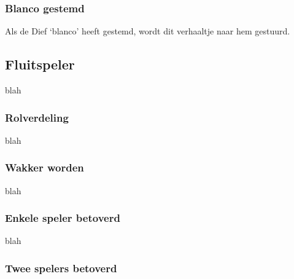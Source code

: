 \documentclass[12pt]{article}
\begin{document}
    \subsubsection{Blanco gestemd}
    
      Als de Dief `blanco' heeft gestemd, wordt dit verhaaltje naar hem gestuurd.
    
      \begin{center}
      \end{center}
  
  \subsection{Fluitspeler}
    
      blah
  
    \subsubsection{Rolverdeling}
    
      blah
    
    \subsubsection{Wakker worden}
    
      blah
    
    \subsubsection{Enkele speler betoverd}
    
      blah
    
    \subsubsection{Twee spelers betoverd}
    
\end{document}
